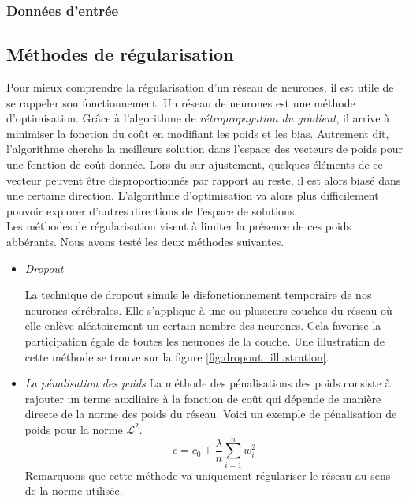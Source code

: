\documentclass[a4paper,11pt]{article}
\begin{document}
    \subsubsection{Données d'entrée}

\subsection{Méthodes de régularisation}
\label{sec:regularization}
    
    Pour mieux comprendre la régularisation d'un réseau de neurones, il est utile de se rappeler son fonctionnement.
    Un réseau de neurones est une méthode d'optimisation.
    Grâce à l'algorithme de \textit{rétropropagation du gradient}, il arrive à minimiser la fonction du coût en modifiant les poids et les bias.
    Autrement dit, l'algorithme cherche la meilleure solution dans l'espace des vecteurs de poids pour une fonction de coût donnée.
    Lors du sur-ajustement, quelques éléments de ce vecteur peuvent être disproportionnés par rapport au reste, il est alors biasé dans une certaine direction.
    L'algorithme d'optimisation va alors plus difficilement pouvoir explorer d'autres directions de l'espace de solutions.
    \\
    Les méthodes de régularisation visent à limiter la présence de ces poids abbérants.
    Nous avons testé les deux méthodes suivantes. 
    \begin{itemize}
        \item{\textit{Dropout}}

            La technique de dropout simule le disfonctionnement temporaire de nos neurones cérébrales.
            Elle s'applique à une ou plusieurs couches du réseau où elle enlève aléatoirement un certain nombre des neurones.
            Cela favorise la participation égale de toutes les neurones de la couche.
            Une illustration de cette méthode se trouve sur la figure \ref{fig:dropout_illustration}. 

        \item{\textit{La pénalisation des poids}}
            La méthode des pénalisations des poids consiste à rajouter un terme auxiliaire à la fonction de coût qui dépende de manière directe de la norme des poids du réseau.
            Voici un exemple de pénalisation de poids pour la norme $\mathcal{L}^2$.
            \begin{equation*}
                c = c_0 + \frac{\lambda}{n}\sum_{i=1}^n w_i^2
            \end{equation*}
        Remarquons que cette méthode va uniquement régulariser le réseau au sens de la norme utilisée.
    \end{itemize}
\end{document}
